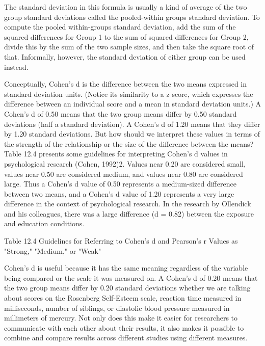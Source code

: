  The standard deviation in this formula is usually a kind of average of the two group standard deviations called the pooled-within groups standard deviation. To compute the pooled within-groups standard deviation, add the sum of the squared differences for Group 1 to the sum of squared differences for Group 2, divide this by the sum of the two sample sizes, and then take the square root of that. Informally, however, the standard deviation of either group can be used instead.

 
 Conceptually, Cohen's d is the difference between the two means expressed in standard deviation units. (Notice its similarity to a z score, which expresses the difference between an individual score and a mean in standard deviation units.) A Cohen's d of 0.50 means that the two group means differ by 0.50 standard deviations (half a standard deviation). A Cohen's d of 1.20 means that they differ by 1.20 standard deviations. But how should we interpret these values in terms of the strength of the relationship or the size of the difference between the means? Table 12.4 presents some guidelines for interpreting Cohen's d values in psychological research (Cohen, 1992)2. Values near 0.20 are considered small, values near 0.50 are considered medium, and values near 0.80 are considered large. Thus a Cohen's d value of 0.50 represents a medium-sized difference between two means, and a Cohen's d value of 1.20 represents a very large difference in the context of psychological research. In the research by Ollendick and his colleagues, there was a large difference (d = 0.82) between the exposure and education conditions.

 
Table 12.4 Guidelines for Referring to Cohen's d and Pearson's r Values as "Strong," "Medium," or "Weak"


Cohen's d is useful because it has the same meaning regardless of the variable being compared or the scale it was measured on. A Cohen's d of 0.20 means that the two group means differ by 0.20 standard deviations whether we are talking about scores on the Rosenberg Self-Esteem scale, reaction time measured in milliseconds, number of siblings, or diastolic blood pressure measured in millimeters of mercury. Not only does this make it easier for researchers to communicate with each other about their results, it also makes it possible to combine and compare results across different studies using different measures.


